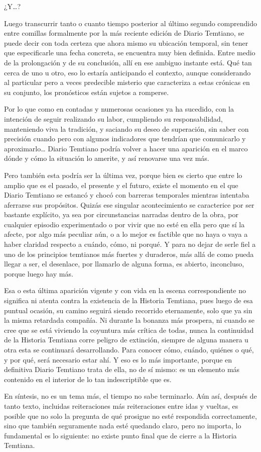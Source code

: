 \documentclass[
]{book}
\begin{document}
¿Y\ldots?

Luego transcurrir tanto o cuanto tiempo posterior al último segundo comprendido entre comillas formalmente por la más reciente edición de Diario Temtiano, se puede decir con toda certeza que ahora mismo su ubicación temporal, sin tener que especificarle una fecha concreta, se encuentra muy bien definida. Entre medio de la prolongación y de su conclusión, allí en ese ambiguo instante está. Qué tan cerca de uno u otro, eso lo estaría anticipando el contexto, aunque considerando al particular pero a veces predecible misterio que caracteriza a estas crónicas en su conjunto, los pronósticos están sujetos a romperse.

Por lo que como en contadas y numerosas ocasiones ya ha sucedido, con la intención de seguir realizando su labor, cumpliendo su responsabilidad, manteniendo viva la tradición, y saciando su deseo de superación, sin saber con precisión cuando pero con algunos indicadores que tendrían que comunicarlo y aproximarlo\ldots{} Diario Temtiano podría volver a hacer una aparición en el marco dónde y cómo la situación lo amerite, y así renovarse una vez más.

Pero también esta podría ser la última vez, porque bien es cierto que entre lo amplio que es el pasado, el presente y el futuro, existe el momento en el que Diario Temtiano se estancó y chocó con barreras temporales mientras intentaba aferrarse sus propósitos. Quizás ese singular acontecimiento se caracterice por ser bastante explícito, ya sea por circunstancias narradas dentro de la obra, por cualquier episodio experimentado o por vivir que no esté en ella pero que sí la afecte, por algo más peculiar aún, o a lo mejor es factible que no haya o vaya a haber claridad respecto a cuándo, cómo, ni porqué. Y para no dejar de serle fiel a uno de los principios temtianos más fuertes y duraderos, más allá de como pueda llegar a ser, el desenlace, por llamarlo de alguna forma, es abierto, inconcluso, porque luego hay más.

Esa o esta última aparición vigente y con vida en la escena correspondiente no significa ni atenta contra la existencia de la Historia Temtiana, pues luego de esa puntual ocasión, su camino seguirá siendo recorrido eternamente, solo que ya sin la misma retardada compañía. Ni durante la bonanza más prospera, ni cuando se cree que se está viviendo la coyuntura más crítica de todas, nunca la continuidad de la Historia Temtiana corre peligro de extinción, siempre de alguna manera u otra esta se continuará desarrollando. Para conocer cómo, cuándo, quiénes o qué, y por qué, será necesario estar ahí. Y eso es lo más importante, porque en definitiva Diario Temtiano trata de ella, no de sí mismo: es un elemento más contenido en el interior de lo tan indescriptible que es.

En síntesis, no es un tema más, el tiempo no sabe terminarlo. Aún así, después de tanto texto, incluidas reiteraciones más reiteraciones entre idas y vueltas, es posible que no solo la pregunta de qué prosigue no esté respondida correctamente, sino que también seguramente nada esté quedando claro, pero no importa, lo fundamental es lo siguiente: no existe punto final que de cierre a la Historia Temtiana.
\end{document}
